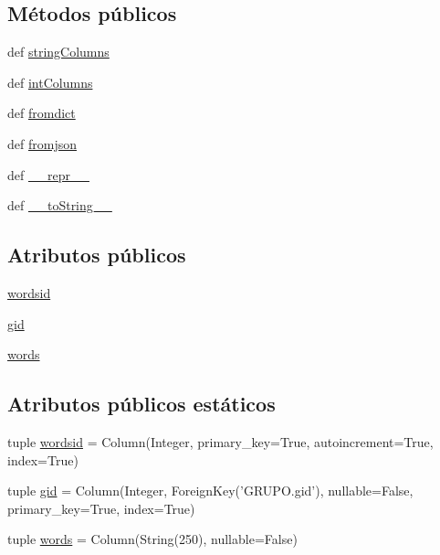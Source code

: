 \subsection*{Métodos públicos}
\begin{DoxyCompactItemize}
\item 
def \hyperlink{classdb__layer_1_1_w_o_r_d_s_a44a84767009d0a95cc0ca80efdc71c37}{string\-Columns}
\item 
def \hyperlink{classdb__layer_1_1_w_o_r_d_s_a46f9d04470b34a3b57de671c98e1313d}{int\-Columns}
\item 
def \hyperlink{classdb__layer_1_1_w_o_r_d_s_a089dc3e33bb3caf90a6b564237793335}{fromdict}
\item 
def \hyperlink{classdb__layer_1_1_w_o_r_d_s_ab1557ec56523b2be35708beb8c09f2f5}{fromjson}
\item 
def \hyperlink{classdb__layer_1_1_w_o_r_d_s_a963538e546aa97f139237d0152cb0170}{\-\_\-\-\_\-repr\-\_\-\-\_\-}
\item 
def \hyperlink{classdb__layer_1_1_w_o_r_d_s_a741add95506ad7ec7d13f88fdd4a86bd}{\-\_\-\-\_\-to\-String\-\_\-\-\_\-}
\end{DoxyCompactItemize}
\subsection*{Atributos públicos}
\begin{DoxyCompactItemize}
\item 
\hyperlink{classdb__layer_1_1_w_o_r_d_s_ae7014f70bc77af166f3649f0bd3c3c71}{wordsid}
\item 
\hyperlink{classdb__layer_1_1_w_o_r_d_s_aaaf779b2b8be0b8fc5b07d67ee8a7ecf}{gid}
\item 
\hyperlink{classdb__layer_1_1_w_o_r_d_s_a71c7bf353b1aebe3e39014792589f31b}{words}
\end{DoxyCompactItemize}
\subsection*{Atributos públicos estáticos}
\begin{DoxyCompactItemize}
\item 
tuple \hyperlink{classdb__layer_1_1_w_o_r_d_s_a191b73a99b2cb5624d7b6561ffba1707}{wordsid} = Column(Integer, primary\-\_\-key=True, autoincrement=True, index=True)
\item 
tuple \hyperlink{classdb__layer_1_1_w_o_r_d_s_ab34399fc663ae9bb749e3bf378e93dc2}{gid} = Column(Integer, Foreign\-Key('G\-R\-U\-P\-O.\-gid'), nullable=False, primary\-\_\-key=True, index=True)
\item 
tuple \hyperlink{classdb__layer_1_1_w_o_r_d_s_adb8240c0cbbcc83b04e6ab5f925d5094}{words} = Column(String(250), nullable=False)
\end{DoxyCompactItemize}


